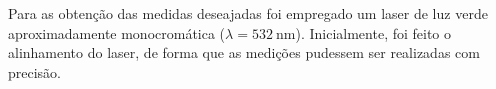 Para as obtenção das medidas deseajadas foi empregado um laser de luz verde aproximadamente monocromática ($\lambda = \SI{532}{\nano\meter}$). Inicialmente, foi feito o alinhamento do laser, de forma que as medições pudessem ser realizadas com precisão.